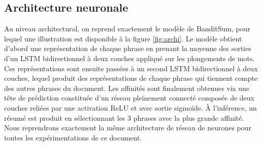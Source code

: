 \subsection{Architecture neuronale}
\label{subsec:archi}

Au niveau architectural, on reprend exactement le modèle 
de BanditSum, pour lequel une illustration est disponible à la 
figure \ref{fig:archi}.
Le modèle obtient d'abord une représentation de chaque phrase 
en prenant la moyenne des sorties d'un LSTM bidirectionnel 
à deux couches appliqué sur les plongements de mots.
Ces représentations sont ensuite passées à un second LSTM bidirectionnel
à deux couches, lequel produit des représentations de chaque phrase
qui tiennent compte des autres phrases du document.
Les affinités sont finalement obtenues via une tête de prédiction
constituée d'un réseau pleinement connecté
composée de deux couches reliées par une activation ReLU et avec sortie 
sigmoïde.
À l'inférence, un résumé est produit en sélectionnant les 
3 phrases avec la plus grande affinité.
Nous reprendrons exactement la même architecture de réseau de neurones pour toutes
les expérimentations de ce document.

